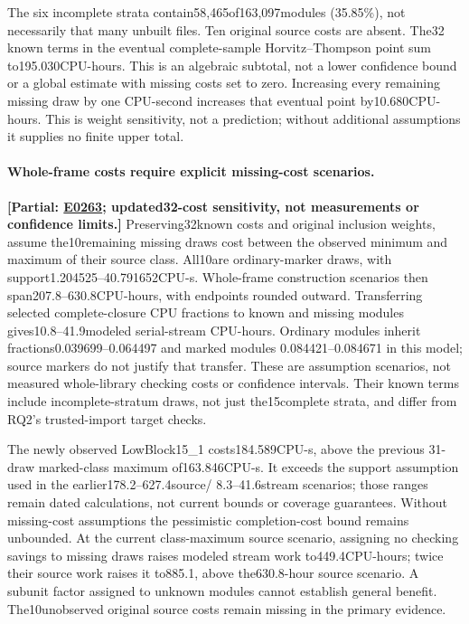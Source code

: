 \documentclass[10pt,twocolumn]{article}
\newcommand{\partialev}[1]{\textbf{[Partial: #1]}}
\newcommand{\expref}[2]{\href{https://github.com/yunwei37/proofserve/blob/main/docs/tmp/build-and-evaluate/step-#1/step-report.md}{E#2}}
\begin{document}
The six incomplete strata contain58,465of163,097modules (35.85\%),
not necessarily that many unbuilt files. Ten original source costs are absent.
The32 known terms in the eventual complete-sample Horvitz--Thompson point
sum to195.030CPU-hours. This is an algebraic subtotal, not a lower confidence
bound or a global estimate with missing costs set to zero.
Increasing every remaining missing draw by one CPU-second increases that
eventual point by10.680CPU-hours. This is weight sensitivity, not a
prediction; without additional assumptions it supplies no finite upper total.

\paragraph{Whole-frame costs require explicit missing-cost scenarios.}
\partialev{\expref{0263-20261102T040256+0000}{0263}; updated32-cost sensitivity, not measurements or confidence limits.}
Preserving32known costs and original inclusion weights, assume the10remaining
missing draws cost between the observed minimum and maximum of their source
class. All10are ordinary-marker draws, with support1.204525--40.791652CPU-s.
Whole-frame construction scenarios then span207.8--630.8CPU-hours,
with endpoints rounded outward.
Transferring selected complete-closure CPU fractions to known and missing
modules gives10.8--41.9modeled serial-stream CPU-hours.
Ordinary modules inherit fractions0.039699--0.064497 and marked modules
0.084421--0.084671 in this model; source markers do not justify that transfer.
These are assumption scenarios, not measured whole-library checking costs
or confidence intervals. Their known terms include incomplete-stratum draws,
not just the15complete strata, and differ from RQ2's trusted-import target checks.

The newly observed LowBlock15_1 costs184.589CPU-s, above the previous
31-draw marked-class maximum of163.846CPU-s.
It exceeds the support assumption used in the earlier178.2--627.4source/
8.3--41.6stream scenarios; those ranges remain dated calculations, not current
bounds or coverage guarantees.
Without missing-cost assumptions the pessimistic completion-cost bound
remains unbounded. At the current class-maximum source scenario, assigning
no checking savings to missing draws raises modeled stream work to449.4CPU-hours;
twice their source work raises it to885.1, above the630.8-hour source scenario.
A subunit factor assigned to unknown modules cannot establish general benefit.
The10unobserved original source costs remain missing in the primary evidence.
\end{document}

